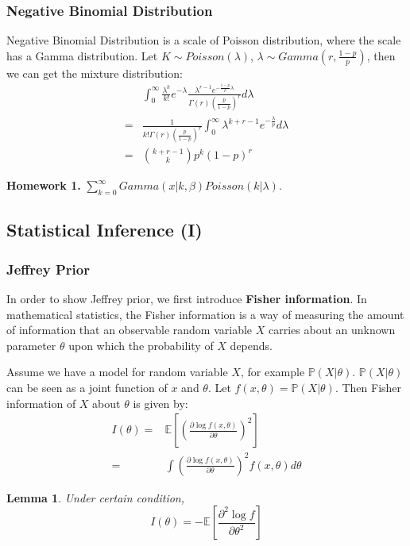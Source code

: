 \documentclass[11pt]{article}
\def\BP{{\bf P}}
\def\BP{{\mathbb P}}
\def\BE{{\mathbb E}}
\newtheorem{lemma}{Lemma}[section]
\begin{document}
\subsubsection{Negative Binomial Distribution}
Negative Binomial Distribution is a scale of Poisson distribution, where the scale has a Gamma distribution.
Let $K \sim Poisson(\lambda)$, $\lambda \sim Gamma(r, \frac{1-p}{p})$, then we can get the mixture distribution:
\[\begin{split}
&  \int_0^\infty \frac{\lambda^k}{k!} e^{-\lambda}
\frac{\lambda^{r-1} e^{-\frac{1-p}{p} \lambda}}{\Gamma(r) (\frac{p}{1-p})^r} d\lambda \\
= & \frac{1}{k! \Gamma(r) (\frac{p}{1-p})^r}  \int_0^\infty  \lambda^{k+r-1}  e^{-\frac{\lambda}{p}} d\lambda \\
 = & {k+r-1 \choose k} p^k (1-p)^r
\end{split}\]

\textbf{Homework 1.}   $\sum\limits_{k=0}^\infty Gamma(x | k, \beta) Poisson (k | \lambda)$.

\subsection{Statistical Inference (I)}

\subsubsection{Jeffrey Prior}
In order to show Jeffrey prior, we first introduce \textbf{Fisher information}. In mathematical statistics, the Fisher information is a way of measuring the amount of information that an observable random variable $X$ carries about an unknown parameter $\theta$ upon which the probability of $X$ depends.

Assume we have a model for random variable $X$, for example $\BP(X| \theta)$. $\BP(X | \theta)$ can be seen as a joint function of $x$ and $\theta$. Let $f(x, \theta) = \BP(X| \theta)$. Then Fisher information of $X$ about $\theta$ is given by:
\[\begin{split} I(\theta)  = &  \BE [(\frac{\partial \log f(x, \theta)}{\partial \theta})^2] \\
 = & \int \left( \frac{\partial \log f(x, \theta)}{\partial \theta} \right)^2 f(x,\theta) d\theta
\end{split}\]

\begin{lemma}
  Under certain condition, \[ I(\theta) = -\BE[\frac{\partial^2 \log f}{\partial \theta^2}]\]
\end{lemma}
\end{document}
